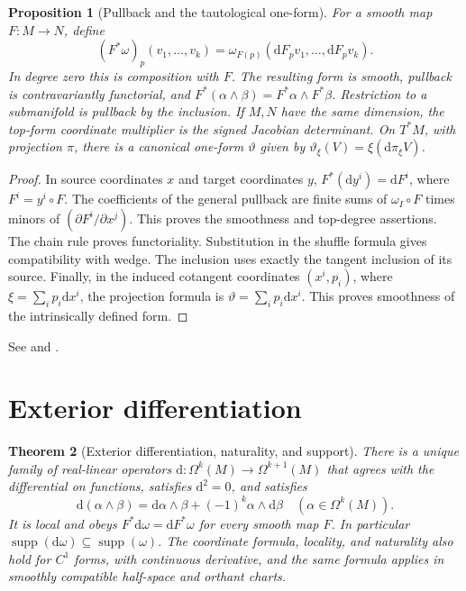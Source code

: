 \documentclass[11pt,oneside,openany]{book}
\newtheorem{theorem}{Theorem}[chapter]
\newtheorem{proposition}[theorem]{Proposition}
\theoremstyle{definition}
\theoremstyle{remark}
\newcommand{\dd}{\mathrm d}
\DeclareMathOperator{\supp}{supp}
\begin{document}
\begin{proposition}[Pullback and the tautological one-form]
\label{p104:M07.02}
For a smooth map \(F:M\to N\), define
\[
 (F^*\omega)_p(v_1,\ldots,v_k)
 =\omega_{F(p)}(\dd F_p v_1,\ldots,\dd F_p v_k).
\]
In degree zero this is composition with \(F\). The resulting form is smooth, pullback is contravariantly functorial, and \(F^*(\alpha\wedge\beta)=F^*\alpha\wedge F^*\beta\). Restriction to a submanifold is pullback by the inclusion. If \(M,N\) have the same dimension, the top-form coordinate multiplier is the signed Jacobian determinant. On \(T^*M\), with projection \(\pi\), there is a canonical one-form \(\vartheta\) given by \(\vartheta_\xi(V)=\xi(\dd\pi_\xi V)\).
\end{proposition}

\begin{proof}
In source coordinates \(x\) and target coordinates \(y\), \(F^*(\dd y^i)=\dd F^i\), where \(F^i=y^i\circ F\). The coefficients of the general pullback are finite sums of \(\omega_I\circ F\) times minors of \((\partial F^i/\partial x^j)\). This proves the smoothness and top-degree assertions. The chain rule proves functoriality. Substitution in the shuffle formula gives compatibility with wedge. The inclusion uses exactly the tangent inclusion of its source. Finally, in the induced cotangent coordinates \((x^i,p_i)\), where \(\xi=\sum_i p_i\dd x^i\), the projection formula is \(\vartheta=\sum_i p_i\dd x^i\). This proves smoothness of the intrinsically defined form.
\end{proof}

See \cite[Lemma 14.16, Proposition 14.20, and Chapter 22]{lee} and \cite[Sections 17.5, 17.6 and 18.5]{tu}.

\section{Exterior differentiation}

\begin{theorem}[Exterior differentiation, naturality, and support]
\label{p104:M07.03}
There is a unique family of real-linear operators \(\dd:\Omega^k(M)\to\Omega^{k+1}(M)\) that agrees with the differential on functions, satisfies \(\dd^2=0\), and satisfies
\[
 \dd(\alpha\wedge\beta)=\dd\alpha\wedge\beta+(-1)^k\alpha\wedge\dd\beta
 \quad(\alpha\in\Omega^k(M)).
\]
It is local and obeys \(F^*\dd\omega=\dd F^*\omega\) for every smooth map \(F\). In particular \(\supp(\dd\omega)\subseteq\supp(\omega)\). The coordinate formula, locality, and naturality also hold for \(C^1\) forms, with continuous derivative, and the same formula applies in smoothly compatible half-space and orthant charts.
\end{theorem}
\end{document}
